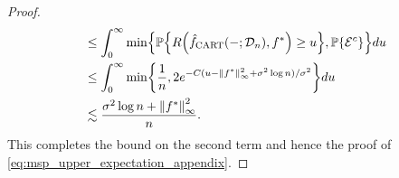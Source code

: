 \documentclass[11pt]{article}
\DeclarePairedDelimiter{\braces}{\lbrace}{\rbrace}
\DeclarePairedDelimiter{\paren}{(}{)}
\DeclarePairedDelimiter{\norm}{\|}{\|}
\renewcommand{\P}{\mathbb{P}}
\newcommand{\E}{\mathbb{E}}
\newcommand{\nsamples}{n}
\newcommand{\data}[1][n]{\mathcal{D}_{#1}}
\newcommand{\event}{\Omega}
\newcommand{\fcart}{\hat{f}_{\operatorname{CART}}}
\begin{document}
\begin{proof}
\begin{equation}
\begin{split}
            & \leq \int_0^\infty \min\braces*{\P\braces*{R\paren*{\fcart(-;\data),f^*} \geq u},\P\braces*{\mathcal{E}^c}} du \\
            & \leq \int_0^\infty \min\braces*{\frac{1}{n},2e^{-C(u-\norm{f^*}_\infty^2 + \sigma^2\log\nsamples)/\sigma^2}} du \\
            & \lesssim \frac{\sigma^2\log\nsamples + \norm*{f^*}_\infty^2}{\nsamples}.
        \end{split}
    \end{equation}
    This completes the bound on the second term and hence the proof of \eqref{eq:msp_upper_expectation_appendix}.
\end{proof}

\end{document}

